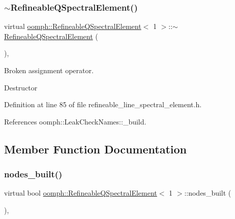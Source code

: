 \subsubsection{\texorpdfstring{$\sim$\+Refineable\+Q\+Spectral\+Element()}{~RefineableQSpectralElement()}}
{\footnotesize\ttfamily virtual \hyperlink{classoomph_1_1RefineableQSpectralElement}{oomph\+::\+Refineable\+Q\+Spectral\+Element}$<$ 1 $>$\+::$\sim$\hyperlink{classoomph_1_1RefineableQSpectralElement}{Refineable\+Q\+Spectral\+Element} (\begin{DoxyParamCaption}{ }\end{DoxyParamCaption})\hspace{0.3cm}{\ttfamily [inline]}, {\ttfamily [virtual]}}



Broken assignment operator. 

Destructor 

Definition at line 85 of file refineable\+\_\+line\+\_\+spectral\+\_\+element.\+h.



References oomph\+::\+Leak\+Check\+Names\+::\+\_\+build.



\subsection{Member Function Documentation}
\mbox{\label{classoomph_1_1RefineableQSpectralElement_3_011_01_4_ae80853a6ef35f51a36028619dde94c7a}} 
\subsubsection{\texorpdfstring{nodes\+\_\+built()}{nodes\_built()}}
{\footnotesize\ttfamily virtual bool \hyperlink{classoomph_1_1RefineableQSpectralElement}{oomph\+::\+Refineable\+Q\+Spectral\+Element}$<$ 1 $>$\+::nodes\+\_\+built (\begin{DoxyParamCaption}{ }\end{DoxyParamCaption})\hspace{0.3cm}{\ttfamily [inline]}, {\ttfamily [virtual]}}



